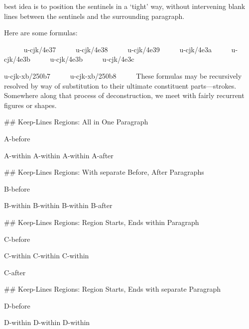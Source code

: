 \begin{multicols}{2}
best idea is to position the sentinels in a ‘tight’ way, without
intervening blank lines between the sentinels and the surrounding
paragraph.\mktsShowpar\par
Here are some formulas:
\mktsShowpar\par
\begingroup{}     
{\mktsStyleCode{}u-cjk/4e37}     
{\mktsStyleCode{}u-cjk/4e38}     
{\mktsStyleCode{}u-cjk/4e39}     
{\mktsStyleCode{}u-cjk/4e3a}     
{\mktsStyleCode{}u-cjk/4e3b}     
{\mktsStyleCode{}u-cjk/4e3b}     
{\mktsStyleCode{}u-cjk/4e3c}     

{\mktsStyleCode{}u-cjk-xb/250b7}     
{\mktsStyleCode{}u-cjk-xb/250b8}     
\endgroup{}These formulas may be recursively resolved by way of substitution to their
ultimate constituent parts—strokes. Somewhere along that process of
deconstruction, we meet with fairly recurrent figures or shapes.\mktsShowpar\par
\#\# Keep-Lines Regions: All in One Paragraph\mktsShowpar\par
\end{multicols}A-before
\mktsShowpar\par
\begingroup\obeyalllines{}A-within
A-within
A-within
\endgroup{}A-after
\begin{multicols}{2}\#\# Keep-Lines Regions: With separate Before, After Paragraphs\mktsShowpar\par
\end{multicols}B-before\mktsShowpar\par
\begingroup\obeyalllines{}B-within
B-within
B-within
\endgroup{}B-after\mktsShowpar\par
\begin{multicols}{2}\#\# Keep-Lines Regions: Region Starts, Ends within Paragraph\mktsShowpar\par
\end{multicols}C-before
\mktsShowpar\par
\begingroup\obeyalllines{}C-within
C-within
C-within

\endgroup{}C-after
\begin{multicols}{2}\#\# Keep-Lines Regions: Region Starts, Ends with separate Paragraph\mktsShowpar\par
\end{multicols}D-before\mktsShowpar\par
\begingroup\obeyalllines{}D-within
D-within
D-within

